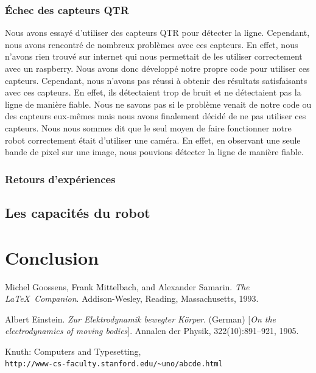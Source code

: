 \documentclass[a4paper, 12pt]{report}
\begin{document}
\subsection{Échec des capteurs QTR}
Nous avons essayé d'utiliser des capteurs QTR pour détecter la ligne. Cependant, nous avons rencontré de nombreux problèmes avec ces capteurs. En effet, nous n'avons rien trouvé sur internet qui nous permettait de les utiliser correctement avec un raspberry.
Nous avons donc développé notre propre code pour utiliser ces capteurs. Cependant, nous n'avons pas réussi à obtenir des résultats satisfaisants avec ces capteurs. En effet, ils détectaient trop de bruit et ne détectaient pas la ligne de manière fiable.
Nous ne savons pas si le problème venait de notre code ou des capteurs eux-mêmes mais nous avons finalement décidé de ne pas utiliser ces capteurs.
Nous nous sommes dit que le seul moyen de faire fonctionner notre robot correctement était d'utiliser une caméra. En effet, en observant une seule bande de pixel sur une image, nous pouvions détecter la ligne de manière fiable.


\subsection{Retours d'expériences}
\section{Les capacités du robot}

\chapter{Conclusion}
\lipsum[9-10]

\begin{thebibliography}{9}
Michel Goossens, Frank Mittelbach, and Alexander Samarin. 
\textit{The \LaTeX\ Companion}. 
Addison-Wesley, Reading, Massachusetts, 1993.

Albert Einstein. 
\textit{Zur Elektrodynamik bewegter K{\"o}rper}. (German) 
[\textit{On the electrodynamics of moving bodies}]. 
Annalen der Physik, 322(10):891–921, 1905.

Knuth: Computers and Typesetting,
\\\texttt{http://www-cs-faculty.stanford.edu/\~{}uno/abcde.html}
\end{thebibliography}
\end{document}
